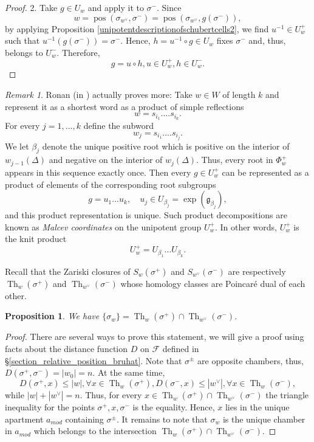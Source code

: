 \documentclass[12pt]{amsbook}%
\newtheorem{prop}[thm]{Proposition}
\theoremstyle{definition}
\theoremstyle{remark}
\newtheorem{rem}[thm]{Remark}
\numberwithin{section}{chapter}
\numberwithin{subsection}{section}
\numberwithin{figure}{chapter}
\DeclareMathOperator{\Th}{Th}
\DeclareMathOperator{\pos}{pos}
\def\amod{a_{mod}}
\def\cF{{\mathscr{F}}}
\def\kap{}
\begin{document}
{{\begin{proof}
2. Take $g\in U_w$ and apply it to $\sigma^-$. Since 
$$
w=\pos(\sigma_{w^\vee}, \sigma^-)= \pos(\sigma_{w^\vee}, g(\sigma^-)),
$$ 
by applying Proposition \ref{unipotentdescriptionofschubertcells2}, we find  
$u^{-1}\in U_w^+$ such that $u^{-1}(g(\sigma^-))=\sigma^-$. Hence, 
$h=u^{-1}\circ g\in U_w$ fixes $\sigma^-$ and, thus, belongs to $U_w^-$. Therefore, 
$$
g=u \circ h,  u\in U_w^+, h\in U_w^-. 
$$
\end{proof}









\begin{rem}\label{rem:gallery}
Ronan (in \cite[Theorem 6.15]{Ronan}) actually proves more: 
Take $w\in W$ of length $k$ and represent it as a shortest word as a product of simple reflections 
$$
w= s_{i_1}....s_{i_k}.
$$
For every $j=1,...,k$ define the subword
$$
w_j= s_{i_1}....s_{i_j}.
$$
We let $\beta_j$ denote the unique positive root which is positive on the interior of $w_{j-1}(\Delta)$ and negative on the interior of $w_j(\Delta)$. Thus, 
every root in $\Phi^+_w$ appears in this sequence exactly once. 
Then every $g\in U_w^+$ can be represented as a product of elements of the corresponding root subgroups 
$$
g=u_{1}... u_{k}, \quad u_{j}\in U_{\beta_{j}}=\exp({\mathfrak g}_{\beta_j}), 
$$
and this product representation is unique. Such product decompositions are known as {\em Malcev coordinates} on the unipotent group $U_w^+$. 
In other words, $U_w^+$ is the knit product
$$
U_w^+= U_{\beta_1}\ldots U_{\beta_k}.
$$
\end{rem}



Recall that the Zariski closures of $S_w(\sigma^+)$ and $S_{w^\vee}(\sigma^-)$ are respectively $\Th_w(\sigma^+)$ and $\Th_{w^\vee}(\sigma^-)$ whose homology classes are Poincar\'e dual of each other. %

\begin{prop}\label{prop:singleton}
We have $\{\sigma_w\}=\Th_w(\sigma^+)\cap\Th_{w^\vee}(\sigma^-)$.
\end{prop}
\begin{proof} There are several ways to prove this statement, we will give a proof using facts about the distance function $D$ on $\cF$ defined in 
\S \ref{section_relative_position_bruhat}. Note that $\sigma^\pm$ are opposite chambers, thus, $D(\sigma^+, \sigma^-)=|w_0|=n$. At the same time, 
$$
D(\sigma^+, x)\le |w|, \forall x\in \Th_w(\sigma^+), D(\sigma^-, x)\le |w^\vee|, \forall x\in \Th_w(\sigma^-),
$$
while $|w|+|w^\vee|=n$. Thus, for every $x\in \Th_w(\sigma^+)\cap\Th_{w^\vee}(\sigma^-)$ the triangle inequality  for the points $\sigma^+, x, \sigma^-$ is the equality. 
Hence, $x$ lies in the unique apartment $\amod$ containing $\sigma^\pm$. It remains to note that $\sigma_w$ is the unique chamber in $\amod$ which belongs to the intersection 
$\Th_w(\sigma^+)\cap\Th_{w^\vee}(\sigma^-)$. \end{proof}

}}
\end{document}

